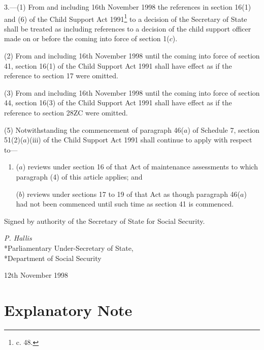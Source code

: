 \documentclass[12pt,a4paper]{article}
\begin{document}
3.—(1) From and including 16th November 1998 the references in section 16(1) and (6) of the Child Support Act 1991\footnote{ c. 48.} to a decision of the Secretary of State shall be treated as including references to a decision of the child support officer made on or before the coming into force of section 1($c$).

(2) From and including 16th November 1998 until the coming into force of section 41, section 16(1) of the Child Support Act 1991 shall have effect as if the reference to section 17 were omitted.

(3) From and including 16th November 1998 until the coming into force of section 44, section 16(3) of the Child Support Act 1991 shall have effect as if the reference to section 28ZC were omitted.


(5) Notwithstanding the commencement of paragraph 46($a$) of Schedule 7, section 51(2)($a$)(iii) of the Child Support Act 1991 shall continue to apply with respect to---
\begin{enumerate}\item[]
($a$) reviews under section 16 of that Act of maintenance assessments to which paragraph (4) of this article applies; and

($b$) reviews under sections 17 to 19 of that Act as though paragraph 46($a$) had not been commenced until such time as section 41 is commenced.
\end{enumerate}


\bigskip

Signed 
by authority of the Secretary of State for Social Security.

{\raggedleft
\emph{P. Hallis}\\*Parliamentary Under-Secretary of State,\\*Department of Social Security

}

12th November 1998

\small

\part{Explanatory Note}
\end{document}
